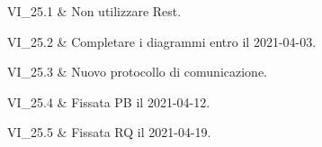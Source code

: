 VI\_25.1 & Non utilizzare Rest.

\tabularnewline

VI\_25.2 & Completare i diagrammi entro il 2021-04-03.

\tabularnewline

VI\_25.3 & Nuovo protocollo di comunicazione.

\tabularnewline
VI\_25.4 & Fissata PB il 2021-04-12.

\tabularnewline

VI\_25.5 & Fissata RQ il 2021-04-19.

